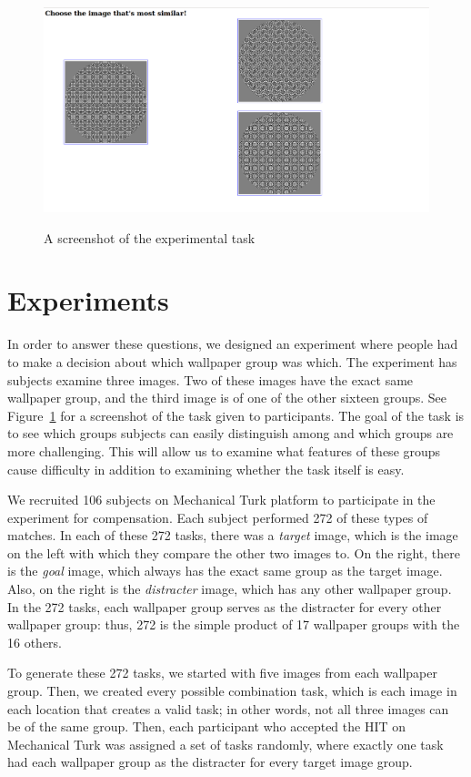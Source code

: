 \begin{figure}[!ht]
\centering
\includegraphics[width=0.9\columnwidth]{symper}
\label{screenshot}
\caption{A screenshot of the experimental task}
\end{figure}


\section{Experiments}
In order to answer these questions, we designed an experiment where people had to make a decision about which wallpaper group was which. The experiment has subjects examine three images. Two of these images have the exact same wallpaper group, and the third image is of one of the other sixteen groups. See Figure~\ref{screenshot} for a screenshot of the task given to participants. The goal of the task is to see which groups subjects can easily distinguish among and which groups are more challenging. This will allow us to examine what features of these groups cause difficulty in addition to examining whether the task itself is easy.

We recruited 106 subjects on Mechanical Turk platform to participate in the experiment for compensation. Each subject performed 272 of these types of matches. In each of these 272 tasks, there was a \textit{target} image, which is the image on the left with which they compare the other two images to. On the right, there is the \textit{goal} image, which always has the exact same group as the target image. Also, on the right is the \textit{distracter} image, which has any other wallpaper group. In the 272 tasks, each wallpaper group serves as the distracter for every other wallpaper group: thus, 272 is the simple product of 17 wallpaper groups with the 16 others.

To generate these 272 tasks, we started with five images from each wallpaper group. Then, we created every possible combination task, which is each image in each location that creates a valid task; in other words, not all three images can be of the same group. Then, each participant who accepted the HIT on Mechanical Turk was assigned a set of tasks randomly, where exactly one task had each wallpaper group as the distracter for every target image group.

